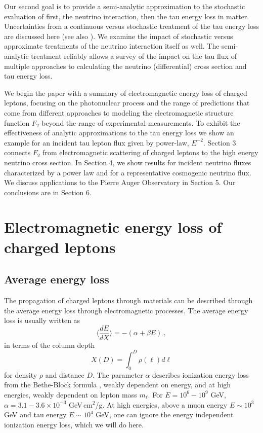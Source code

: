 \documentclass[aps,10pt,twocolumn,tightenlines]{revtex4-1}
\begin{document}
Our second goal is to provide a semi-analytic approximation to the stochastic evaluation of first, the neutrino interaction, then the tau energy loss in matter. Uncertainties from a continuous versus stochastic treatment of the tau energy loss
are discussed here (see also \cite{Bigas:2008ff}).
We examine the impact of stochastic versus
approximate treatments of the neutrino interaction itself as well. The semi-analytic treatment reliably allows a survey of the impact on the tau flux of multiple approaches to calculating the neutrino (differential) cross section and tau energy loss.

We begin the paper with a summary of electromagnetic energy loss 
of charged leptons, focusing on the photonuclear process and 
the range of predictions that come from different approaches 
to modeling the electromagnetic structure function $F_2$ beyond 
the range of experimental measurements.  To 
exhibit the effectiveness of analytic approximations to the tau energy 
loss we show an example for an incident tau lepton flux given by 
power-law, $E^{-2}$.  
Section 3 connects $F_2$ from electromagnetic scattering of charged leptons to the high energy neutrino cross section. In Section 4, we show results for incident neutrino fluxes characterized by a power law and for a representative cosmogenic neutrino flux.  We discuss applications to the Pierre Auger Observatory in Section 5. Our conclusions are in Section 6.


\section{Electromagnetic energy loss of charged leptons}

\subsection{Average energy loss}

The propagation of charged leptons through materials can be described through the average energy loss through electromagnetic processes. The
average energy loss is usually written as
\begin{equation}
\Biggl\langle \frac{dE}{dX}\Biggr\rangle = -(\alpha+\beta E)\ ,
\end{equation}
in terms of the column depth
\begin{equation}
X(D) = \int_0^D \rho(\ell) d\ell 
\end{equation}
for density $\rho$ and distance $D$.
The parameter $\alpha$ describes ionization energy loss from the Bethe-Block formula \cite{Rossi:1952kt}, weakly dependent on energy, and at high energies, weakly dependent on lepton mass $m_\ell$. For $E=10^6-10^9$ GeV,
$\alpha = 3.1-3.6\times 10^{-3}$ GeV\,cm$^2$/g. At high energies, above  a muon energy $E\sim 10^3 $ GeV and 
tau energy $E\sim 10^4$ GeV, one can ignore the energy independent ionization energy loss, which we will do
here. 
\end{document}
